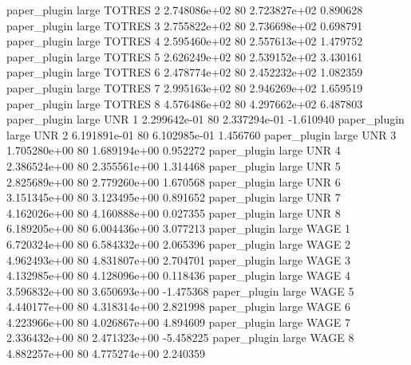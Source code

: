        paper_plugin      large   TOTRES                 2 2.748086e+02 80   2.723827e+02           0.890628
       paper_plugin      large   TOTRES                 3 2.755822e+02 80   2.736698e+02           0.698791
       paper_plugin      large   TOTRES                 4 2.595460e+02 80   2.557613e+02           1.479752
       paper_plugin      large   TOTRES                 5 2.626249e+02 80   2.539152e+02           3.430161
       paper_plugin      large   TOTRES                 6 2.478774e+02 80   2.452232e+02           1.082359
       paper_plugin      large   TOTRES                 7 2.995163e+02 80   2.946269e+02           1.659519
       paper_plugin      large   TOTRES                 8 4.576486e+02 80   4.297662e+02           6.487803
       paper_plugin      large      UNR                 1 2.299642e-01 80   2.337294e-01          -1.610940
       paper_plugin      large      UNR                 2 6.191891e-01 80   6.102985e-01           1.456760
       paper_plugin      large      UNR                 3 1.705280e+00 80   1.689194e+00           0.952272
       paper_plugin      large      UNR                 4 2.386524e+00 80   2.355561e+00           1.314468
       paper_plugin      large      UNR                 5 2.825689e+00 80   2.779260e+00           1.670568
       paper_plugin      large      UNR                 6 3.151345e+00 80   3.123495e+00           0.891652
       paper_plugin      large      UNR                 7 4.162026e+00 80   4.160888e+00           0.027355
       paper_plugin      large      UNR                 8 6.189205e+00 80   6.004436e+00           3.077213
       paper_plugin      large     WAGE                 1 6.720324e+00 80   6.584332e+00           2.065396
       paper_plugin      large     WAGE                 2 4.962493e+00 80   4.831807e+00           2.704701
       paper_plugin      large     WAGE                 3 4.132985e+00 80   4.128096e+00           0.118436
       paper_plugin      large     WAGE                 4 3.596832e+00 80   3.650693e+00          -1.475368
       paper_plugin      large     WAGE                 5 4.440177e+00 80   4.318314e+00           2.821998
       paper_plugin      large     WAGE                 6 4.223966e+00 80   4.026867e+00           4.894609
       paper_plugin      large     WAGE                 7 2.336432e+00 80   2.471323e+00          -5.458225
       paper_plugin      large     WAGE                 8 4.882257e+00 80   4.775274e+00           2.240359